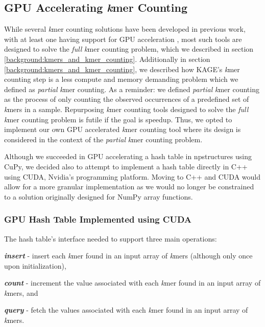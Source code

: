 \subsection{GPU Accelerating \textit{k}mer Counting} \label{methods:gpu_accelerating_kmer_counting}
While several \textit{k}mer counting solutions have been developed in previous work, with at least one having support for GPU acceleration \cite{kmer_counting_tools}, most such tools are designed to solve the \textit{full} \textit{k}mer counting problem, which we described in section \ref{background:kmers_and_kmer_counting}.
Additionally in section \ref{background:kmers_and_kmer_counting}, we described how KAGE's \textit{k}mer counting step is a less compute and memory demanding problem which we defined as \textit{partial} \textit{k}mer counting.
As a reminder: we defined \textit{partial} \textit{k}mer counting as the process of only counting the observed occurrences of a predefined set of \textit{k}mers in a sample.
Repurposing \textit{k}mer counting tools designed to solve the \textit{full} \textit{k}mer counting problem is futile if the goal is speedup.
Thus, we opted to implement our own GPU accelerated \textit{k}mer counting tool where its design is considered in the context of the \textit{partial} \textit{k}mer counting problem.

Although we succeeded in GPU accelerating a hash table in npstructures using CuPy, we decided also to attempt to implement a hash table directly in C++ using CUDA, Nvidia's programming platform.
Moving to C++ and CUDA would allow for a more granular implementation as we would no longer be constrained to a solution originally designed for NumPy array functions.

\subsubsection{GPU Hash Table Implemented using CUDA}
The hash table's interface needed to support three main operations: 
\begin{compactenum}
  \item
    \textbf{\textit{insert}} - insert each \textit{k}mer found in an input array of \textit{k}mers (although only once upon initialization),
  \item
    \textbf{\textit{count}} - increment the value associated with each \textit{k}mer found in an input array of \textit{k}mers, and
  \item
    \textbf{\textit{query}} - fetch the values associated with each \textit{k}mer found in an input array of \textit{k}mers.
\end{compactenum}

